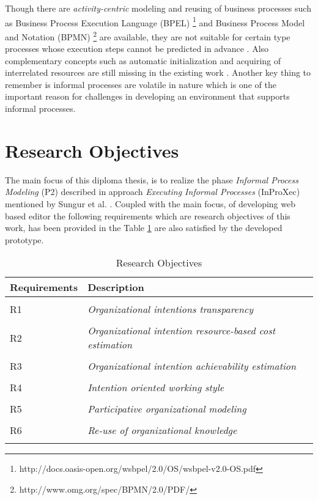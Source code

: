 Though there are \textit{activity-centric} modeling and reusing of business processes such as Business Process Execution Language (BPEL) \footnote{http://docs.oasis-open.org/wsbpel/2.0/OS/wsbpel-v2.0-OS.pdf} and Business Process Model and Notation (BPMN) \footnote{http://www.omg.org/spec/BPMN/2.0/PDF/} are available, they are not suitable for certain type processes whose execution steps cannot be predicted in advance \cite{Sungur2014a}. Also complementary concepts such as automatic initialization and acquiring of interrelated resources are still missing in the existing work \cite{Sungur2015}. Another key thing to remember is informal processes are volatile in nature which is one of the important reason for challenges in developing an environment that supports informal processes.

\section {Research Objectives}
\label{sec:researchobjectives}
The main focus of this diploma thesis, is to realize the phase \textit{Informal Process Modeling} (P2) described in approach \textit{Executing Informal Processes} (InProXec) mentioned by Sungur et al. \cite{Sungur2015}. Coupled with the main focus, of developing web based editor the following requirements which are research objectives of this work, has been provided in the Table \ref{tab:researchobjectives} are also satisfied by the developed prototype. 

\label{sec:researchobj}
\begin{center}
	\begin{longtable}{p{5cm}p{11cm}} 
   	\toprule 
	\textbf{Requirements} & \textbf{Description} \\
	\midrule
	\endfirsthead
	\\
	R1 & \textit{Organizational intentions transparency}  \label{ro1} \\
	\\[-1.5ex]
	R2 & \textit{Organizational intention resource-based cost estimation}  \label{ro2} \\
	\\[-1.5ex]
	R3 & \textit{Organizational intention achievability estimation} \label{ro3}\\
	\\[-1.5ex]
	R4 & \textit{Intention oriented working style}  \label{ro4}\\
	\\[-1.5ex]
	R5 & \textit{Participative organizational modeling}\label{ro5}\\
	\\[-1.5ex]
	R6 & \textit{Re-use of organizational knowledge} \label{ro6}\\
	
	\bottomrule
	\caption{Research Objectives}
	\label{tab:researchobjectives}
	\end{longtable}	
\end{center}

